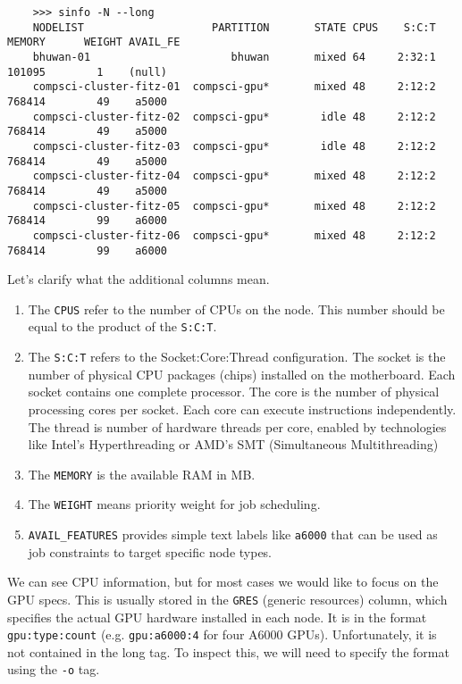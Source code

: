   \begin{lstlisting}
    >>> sinfo -N --long
    NODELIST                    PARTITION       STATE CPUS    S:C:T MEMORY      WEIGHT AVAIL_FE
    bhuwan-01                      bhuwan       mixed 64     2:32:1   101095        1    (null)
    compsci-cluster-fitz-01  compsci-gpu*       mixed 48     2:12:2   768414        49    a5000
    compsci-cluster-fitz-02  compsci-gpu*        idle 48     2:12:2   768414        49    a5000
    compsci-cluster-fitz-03  compsci-gpu*        idle 48     2:12:2   768414        49    a5000
    compsci-cluster-fitz-04  compsci-gpu*       mixed 48     2:12:2   768414        49    a5000
    compsci-cluster-fitz-05  compsci-gpu*       mixed 48     2:12:2   768414        99    a6000
    compsci-cluster-fitz-06  compsci-gpu*       mixed 48     2:12:2   768414        99    a6000
  \end{lstlisting} 

  Let's clarify what the additional columns mean. 
  \begin{enumerate}
    \item The \texttt{CPUS} refer to the number of CPUs on the node. This number should be equal to the product of the \texttt{S:C:T}. 
    \item The \texttt{S:C:T} refers to the Socket:Core:Thread configuration. The socket is the number of physical CPU packages (chips) installed on the motherboard. Each socket contains one complete processor. The core is the number of physical processing cores per socket. Each core can execute instructions independently. The thread is number of hardware threads per core, enabled by technologies like Intel's Hyperthreading or AMD's SMT (Simultaneous Multithreading)
    \item The \texttt{MEMORY} is the available RAM in MB. 
    \item The \texttt{WEIGHT} means priority weight for job scheduling. 
    \item \texttt{AVAIL\_FEATURES} provides simple text labels like \texttt{a6000} that can be used as job constraints to target specific node types. 
  \end{enumerate}

  We can see CPU information, but for most cases we would like to focus on the GPU specs. This is usually stored in the \texttt{GRES} (generic resources) column, which specifies the actual GPU hardware installed in each node. It is in the format \texttt{gpu:type:count} (e.g. \texttt{gpu:a6000:4} for four A6000 GPUs). Unfortunately, it is not contained in the long tag. To inspect this, we will need to specify the format using the \texttt{-o} tag. 

